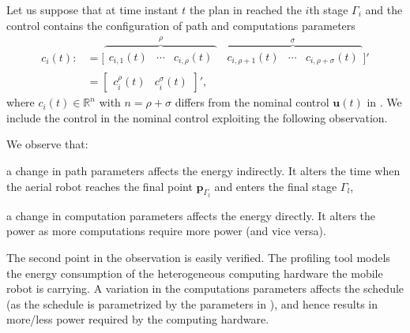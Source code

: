 Let us suppose that at time instant $t$ the plan in  reached the $i$th stage $\Gamma_i$ and the control contains the configuration of path and computations parameters 
\begin{equation}\label{eq:state-control2}\begin{split}
  c_i(t):&=\Big[\overbrace{\begin{matrix}c_{i,1}(t)&\cdots&c_{i,\rho}(t)\end{matrix}}^{\rho} \,\,\, \overbrace{\begin{matrix}c_{i,\rho+1}(t)&\cdots&c_{i,\rho+\sigma}(t)\end{matrix}}^{\sigma}\Big]'\\
  &=\begin{bmatrix}c_i^\rho(t) & c_i^\sigma(t)\end{bmatrix}',
\end{split}\end{equation}
where $c_i(t)\in\mathbb{R}^n$ with $n=\rho+\sigma$ differs from the nominal control $\mathbf{u}(t)$ in . We include the control in the nominal control exploiting the following observation. 

\begin{highlight}
  \begin{obs}
    We observe that:
    \begin{enumerate*}[label={(\alph*)},font={\textit}]
      \item a change in path parameters affects the energy indirectly. It alters the time when the aerial robot reaches the final point $\mathbf{p}_{\Gamma_l}$ and enters the final stage $\Gamma_l$,
      \item a change in computation parameters affects the energy directly. It alters the power as more computations require more power (and vice versa).
    \end{enumerate*}
  \end{obs}
\end{highlight}

The second point in the observation is easily verified. The \powprof{} profiling tool models the energy consumption of the heterogeneous computing hardware the mobile robot is carrying. A variation in the computations parameters affects the schedule (as the schedule is parametrized by the parameters in ), and hence results in more/less power required by the computing hardware.

